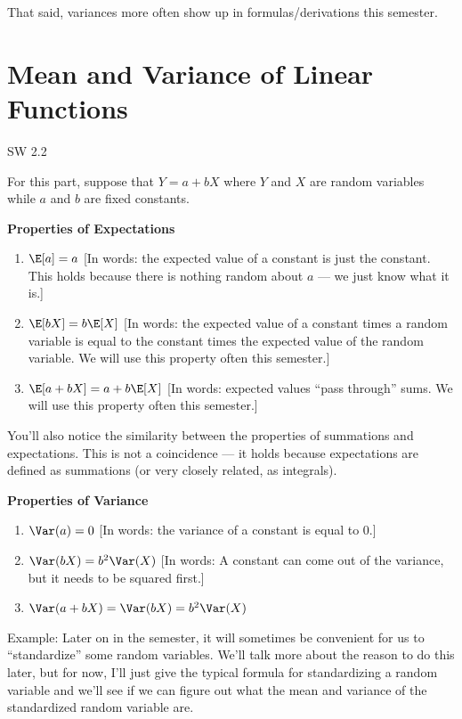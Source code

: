 \documentclass[
  letterpaper,
  DIV=11,
  numbers=noendperiod]{scrreprt}
\begin{document}
That said, variances more often show up in formulas/derivations this
semester.

\section{Mean and Variance of Linear
Functions}\label{mean-and-variance-of-linear-functions}

SW 2.2

For this part, suppose that \(Y=a + bX\) where \(Y\) and \(X\) are
random variables while \(a\) and \(b\) are fixed constants.

\textbf{Properties of Expectations}

\begin{enumerate}
\def\labelenumi{\arabic{enumi}.}
\item
  \(\E[a] = a\) {[}In words: the expected value of a constant is just
  the constant. This holds because there is nothing random about \(a\)
  --- we just know what it is.{]}
\item
  \(\E[bX] = b\E[X]\) {[}In words: the expected value of a constant
  times a random variable is equal to the constant times the expected
  value of the random variable. We will use this property often this
  semester.{]}
\item
  \(\E[a + bX] = a + b\E[X]\) {[}In words: expected values ``pass
  through'' sums. We will use this property often this semester.{]}
\end{enumerate}

You'll also notice the similarity between the properties of summations
and expectations. This is not a coincidence --- it holds because
expectations are defined as summations (or very closely related, as
integrals).

\textbf{Properties of Variance}

\begin{enumerate}
\def\labelenumi{\arabic{enumi}.}
\item
  \(\Var(a) = 0\) {[}In words: the variance of a constant is equal to
  0.{]}
\item
  \(\Var(bX) = b^2 \Var(X)\) {[}In words: A constant can come out of the
  variance, but it needs to be squared first.{]}
\item
  \(\Var(a + bX) = \Var(bX) = b^2 \Var(X)\)
\end{enumerate}

{Example: }Later on in the semester, it will sometimes be convenient for
us to ``standardize'' some random variables. We'll talk more about the
reason to do this later, but for now, I'll just give the typical formula
for standardizing a random variable and we'll see if we can figure out
what the mean and variance of the standardized random variable are.
\end{document}
